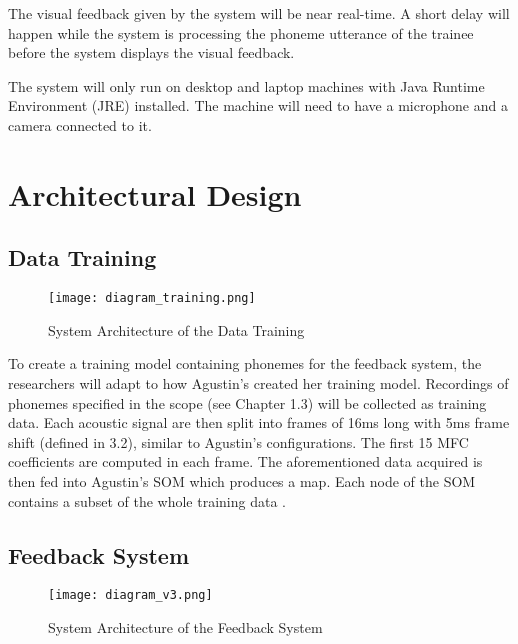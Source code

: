 The visual feedback given by the system will be near real-time. A short delay will happen while the system is processing the phoneme utterance of the trainee before the system displays the visual feedback.

The system will only run on desktop and laptop machines with Java Runtime Environment (JRE) installed. The machine will need to have a microphone and a camera connected to it.

\pagebreak

\section{Architectural Design}

\subsection{Data Training}

\begin{figure}[h]
    \centering
    \texttt{[image: diagram\_training.png]}
    \caption{System Architecture of the Data Training}
    \label{fig:architecture-training}
\end{figure}

To create a training model containing phonemes for the feedback system, the researchers will adapt to how Agustin's \citeyear{agustin:2014:SOM} created her training model. Recordings of phonemes specified in the scope (see Chapter 1.3) will be collected as training data. Each acoustic signal are then split into frames of 16ms long with 5ms frame shift (defined in 3.2), similar to Agustin's configurations. The first 15 MFC coefficients are computed in each frame. The aforementioned data acquired is then fed into Agustin's SOM which produces a map. Each node of the SOM contains a subset of the whole training data \cite{agustin:2014:SOM}.

\subsection{Feedback System}

\begin{figure}[h]
    \centering
    \texttt{[image: diagram\_v3.png]}
    \caption{System Architecture of the Feedback System}
    \label{fig:architecture}
\end{figure}

